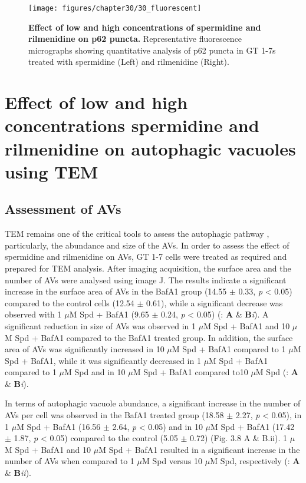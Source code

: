 \begin{figure}[!htbp]
\center
  \texttt{[image: figures/chapter30/30\_fluorescent]}
  \caption[Effect of low and high concentrations of spermidine and rilmenidine on p62 puncta - fluorescence micrographs]{\textbf{Effect of low and high concentrations of spermidine and rilmenidine on p62 puncta.} Representative fluorescence micrographs showing quantitative analysis of p62 puncta in GT 1-7s treated with spermidine (Left) and rilmenidine (Right).}
  \label{fig:30_fluorescent}
\end{figure} 

\section{Effect of low and high concentrations spermidine and rilmenidine on autophagic vacuoles using TEM}
\subsection{Assessment of AVs}
TEM remains one of the critical tools to assess the autophagic pathway \citep{klionsky2016}, particularly, the abundance and size of the AVs.  In order to assess the effect of spermidine and rilmenidine on AVs, GT 1-7 cells were treated as required and prepared for TEM analysis. After imaging acquisition, the surface area and the number of AVs were analysed using image J. The results indicate a significant increase in the surface area of AVs in the BafA1 group (14.55 $\pm$ 0.33, \textit{p} < 0.05) compared to the control cells (12.54 $\pm$ 0.61), while a significant decrease was observed with 1 $\mu$M Spd + BafA1 (9.65 $\pm$ 0.24, \textit{p} < 0.05) (: \textbf{A} \& \textbf{B}\textit{i}).  A significant reduction in size of AVs was observed in 1 $\mu$M Spd + BafA1 and 10 $\mu$M Spd + BafA1 compared to the BafA1 treated group. In addition, the surface area of AVs was significantly increased in 10 $\mu$M Spd + BafA1 compared to 1 $\mu$M Spd + BafA1, while it was significantly decreased in 1 $\mu$M Spd + BafA1 compared to 1 $\mu$M Spd and in 10 $\mu$M Spd + BafA1 compared to10 $\mu$M Spd (: \textbf{A} \& \textbf{B}\textit{i}). 
 
In terms of autophagic vacuole abundance, a significant increase in the number of AVs per cell was observed in the BafA1 treated group (18.58 $\pm$ 2.27, \textit{p} < 0.05), in 1 $\mu$M Spd + BafA1 (16.56 $\pm$ 2.64, \textit{p} < 0.05) and in 10 $\mu$M Spd + BafA1 (17.42 $\pm$ 1.87, \textit{p} < 0.05) compared to the control (5.05 $\pm$ 0.72) (Fig. 3.8 A \& B.ii). 1 $\mu$M Spd + BafA1 and 10 $\mu$M Spd + BafA1 resulted in a significant increase in the number of AVs when compared to 1 $\mu$M Spd versus 10 $\mu$M Spd, respectively (: \textbf{A} \& \textbf{B}\textit{ii}).

